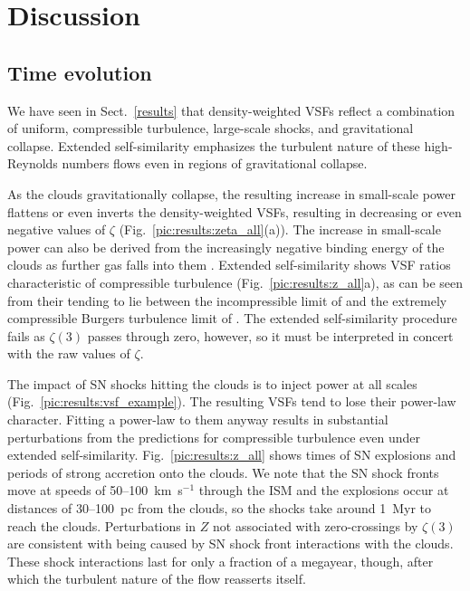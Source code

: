 \section{Discussion}\label{discussion}

\subsection{Time evolution}\label{discussion:normal}

We have seen in Sect.~\ref{results} that density-weighted VSFs reflect a combination of uniform, compressible turbulence, large-scale shocks, and gravitational collapse.  Extended self-similarity emphasizes the turbulent nature of these high-Reynolds numbers flows even in regions of gravitational collapse. 

As the clouds gravitationally collapse, the resulting increase in small-scale power flattens or even inverts the density-weighted VSFs, resulting in decreasing or even negative values of $\zeta$ (Fig.~\ref{pic:results:zeta_all}(a)). The increase in small-scale power can also be derived from the increasingly negative binding energy of the clouds as further gas falls into them .  Extended self-similarity shows VSF ratios characteristic of compressible turbulence (Fig.~\ref{pic:results:z_all}a), as can be seen from their tending to lie between the incompressible limit of \citet{She1994} and the extremely compressible Burgers turbulence limit of \citet{Boldyrev2002}.  The extended self-similarity procedure fails as $\zeta(3)$ passes through zero, however, so it must be interpreted in concert with the raw values of $\zeta$.

The impact of SN shocks hitting the clouds is to inject power at all scales (Fig.~\ref{pic:results:vsf_example}).  The resulting VSFs tend to lose their power-law character. Fitting a power-law to them anyway results in substantial perturbations from the predictions for compressible turbulence even under extended self-similarity.  Fig.~\ref{pic:results:z_all} shows times of SN explosions and periods of strong accretion onto the clouds.  We note that the SN shock fronts move at speeds of 50--100~km~s$^{-1}$ through the ISM and the explosions occur at distances of 30--100~pc from the clouds, so the shocks take around 1~Myr to reach the clouds. Perturbations in $Z$ not associated with zero-crossings by $\zeta(3)$ are consistent with being caused by SN shock front interactions with the clouds.  These shock interactions last for only a fraction of a megayear, though, after which the turbulent nature of the flow reasserts itself.



